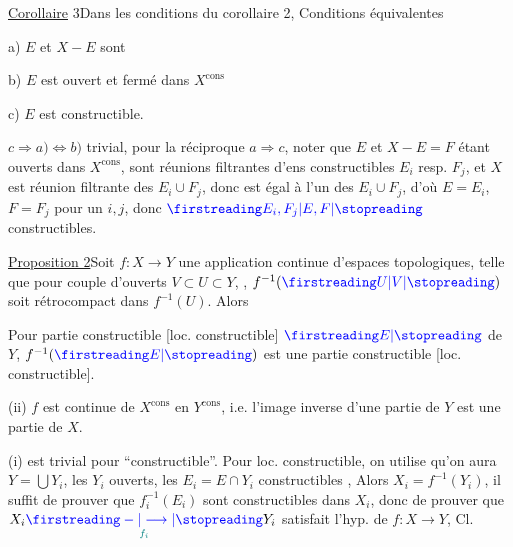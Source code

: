 \uline{Corollaire} 3\quad Dans les conditions du corollaire 2, Conditions équivalentes

a) $E$ et $X-E$ sont 

b) $E$ est  ouvert et fermé dans $X^{\mathrm{cons}}$

c) $E$ est constructible.


$c\Longrightarrow a)\Longleftrightarrow b)$ trivial, pour la réciproque $a\Longrightarrow c$, noter que $E$ et $X-E=F$ étant ouverts dans $X^{\mathrm{cons}}$, sont réunions   filtrantes d'ens constructibles $E_i$ resp. $F_j$, et $X$ est réunion filtrante des $E_i\cup F_j$, donc est égal à l'un des $E_i\cup F_j$, d'où $E=E_i$,  $F=F_j$ pour un $i,j$, donc $\unsure{E_i,F_j|E,F}$ constructibles.

\uline{Proposition 2}\quad Soit $f:X\longrightarrow Y$ une application continue d'espaces topologiques, telle que  pour \unsure{$\forall$} couple d'ouverts $V\subset U\subset Y$, , $f^{-1}(\unsure{U|V})$ soit rétrocompact dans $f^{-1}(U)$. Alors



 Pour \unsure{$\forall$} partie constructible [loc. constructible]  $\unsure{E}$ de $Y$, $f^{-1}(\unsure{E})$ est une partie constructible [loc. constructible].

(ii) $f$ est continue de $X^{\mathrm{cons}}$ en $Y^{\mathrm{cons}}$, i.e. l'image inverse d'une partie   de $Y$ est une partie   de $X$.


 (i) est trivial pour ``constructible''. Pour loc. constructible, on utilise qu'on aura $Y=\bigcup Y_i$, les $Y_i$ ouverts, les $E_i=E\cap Y_i$ constructibles , Alors $X_i=f^{-1}(Y_i)$,  il suffit de prouver que $f_i^{-1}(E_i)$ sont constructibles dans $X_i$, donc de prouver que $X_i\underset{\inserted{f_i}}{\unsure{-|\longrightarrow}}Y_i$ satisfait l'hyp. de $f:X\longrightarrow Y$,  Cl.

